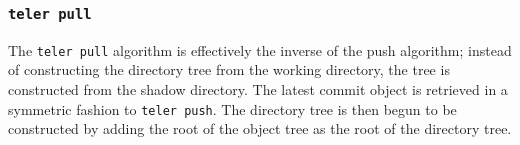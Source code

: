 \documentclass[11pt, letterpaper]{article}
\begin{document}
\begin{multicols}{2}
\begin{center}
\begin{minipage}{.2\textwidth}
\begin{tikzpicture}[scale=0.85]
      \end{tikzpicture}
    \end{minipage}
    \begin{minipage}{.25\textwidth}
    \end{minipage}
  \end{center}


  \subsubsection{\texttt{teler pull}}
  \label{subsubsec:pull}
  The \texttt{teler pull} algorithm is effectively the inverse of the
  push algorithm; instead of constructing the directory tree
  from the working directory, the tree is constructed from the shadow
  directory. The latest commit object is retrieved in a symmetric
  fashion to \texttt{teler push}. The directory tree is then begun to
  be constructed by adding the root of the object tree as the root of
  the directory tree.


\end{multicols}
\end{document}
